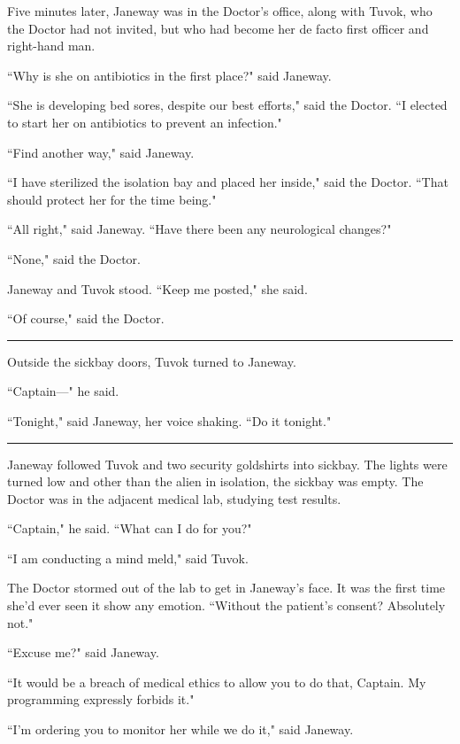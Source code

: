 \documentclass[twoside,letterpaper,12pt]{memoir}
\begin{document}
Five minutes later, Janeway was in the Doctor's office, along with Tuvok, who the Doctor had not invited, but who had become her de facto first officer and right-hand man.

``Why is she on antibiotics in the first place?" said Janeway. 

``She is developing bed sores, despite our best efforts," said the Doctor. ``I elected to start her on antibiotics to prevent an infection." 

``Find another way," said Janeway. 

``I have sterilized the isolation bay and placed her inside," said the Doctor. ``That should protect her for the time being." 

``All right," said Janeway. ``Have there been any neurological changes?" 

``None," said the Doctor. 

Janeway and Tuvok stood. ``Keep me posted," she said. 

``Of course," said the Doctor. 

\begin{center}\rule{3cm}{0.4 pt}\end{center} 

Outside the sickbay doors, Tuvok turned to Janeway. 

``Captain---" he said. 

``Tonight," said Janeway, her voice shaking. ``Do it tonight." 

\begin{center}\rule{3cm}{0.4 pt}\end{center} 

Janeway followed Tuvok and two security goldshirts into sickbay. The lights were turned low and other than the alien in isolation, the sickbay was empty. The Doctor was in the adjacent medical lab, studying test results. 

``Captain," he said. ``What can I do for you?" 

``I am conducting a mind meld," said Tuvok. 

The Doctor stormed out of the lab to get in Janeway's face. It was the first time she'd ever seen it show any emotion. ``Without the patient's consent? Absolutely not." 

``Excuse me?" said Janeway. 

``It would be a breach of medical ethics to allow you to do that, Captain. My programming expressly forbids it." 

``I'm ordering you to monitor her while we do it," said Janeway. 
\end{document}
